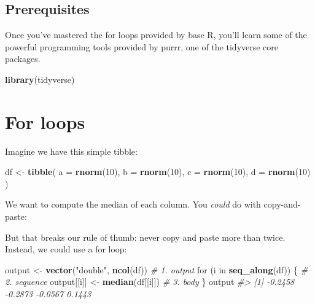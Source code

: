 \documentclass[]{book}
\newenvironment{Shaded}{\begin{snugshade}}{\end{snugshade}}
\newcommand{\KeywordTok}[1]{\textcolor[rgb]{0.13,0.29,0.53}{\textbf{{#1}}}}
\newcommand{\DataTypeTok}[1]{\textcolor[rgb]{0.13,0.29,0.53}{{#1}}}
\newcommand{\DecValTok}[1]{\textcolor[rgb]{0.00,0.00,0.81}{{#1}}}
\newcommand{\StringTok}[1]{\textcolor[rgb]{0.31,0.60,0.02}{{#1}}}
\newcommand{\CommentTok}[1]{\textcolor[rgb]{0.56,0.35,0.01}{\textit{{#1}}}}
\newcommand{\NormalTok}[1]{{#1}}
\begin{document}
\subsection{Prerequisites}\label{prerequisites-14}

Once you've mastered the for loops provided by base R, you'll learn some
of the powerful programming tools provided by purrr, one of the
tidyverse core packages.

\begin{Shaded}
\begin{Highlighting}[]
\KeywordTok{library}\NormalTok{(tidyverse)}
\end{Highlighting}
\end{Shaded}

\section{For loops}\label{for-loops}

Imagine we have this simple tibble:

\begin{Shaded}
\begin{Highlighting}[]
\NormalTok{df <-}\StringTok{ }\KeywordTok{tibble}\NormalTok{(}
  \DataTypeTok{a =} \KeywordTok{rnorm}\NormalTok{(}\DecValTok{10}\NormalTok{),}
  \DataTypeTok{b =} \KeywordTok{rnorm}\NormalTok{(}\DecValTok{10}\NormalTok{),}
  \DataTypeTok{c =} \KeywordTok{rnorm}\NormalTok{(}\DecValTok{10}\NormalTok{),}
  \DataTypeTok{d =} \KeywordTok{rnorm}\NormalTok{(}\DecValTok{10}\NormalTok{)}
\NormalTok{)}
\end{Highlighting}
\end{Shaded}

We want to compute the median of each column. You \emph{could} do with
copy-and-paste:

\begin{Shaded}
\end{Shaded}

But that breaks our rule of thumb: never copy and paste more than twice.
Instead, we could use a for loop:

\begin{Shaded}
\begin{Highlighting}[]
\NormalTok{output <-}\StringTok{ }\KeywordTok{vector}\NormalTok{(}\StringTok{"double"}\NormalTok{, }\KeywordTok{ncol}\NormalTok{(df))  }\CommentTok{# 1. output}
\NormalTok{for (i in }\KeywordTok{seq_along}\NormalTok{(df)) \{            }\CommentTok{# 2. sequence}
  \NormalTok{output[[i]] <-}\StringTok{ }\KeywordTok{median}\NormalTok{(df[[i]])      }\CommentTok{# 3. body}
\NormalTok{\}}
\NormalTok{output}
\CommentTok{#> [1] -0.2458 -0.2873 -0.0567  0.1443}
\end{Highlighting}
\end{Shaded}
\end{document}
